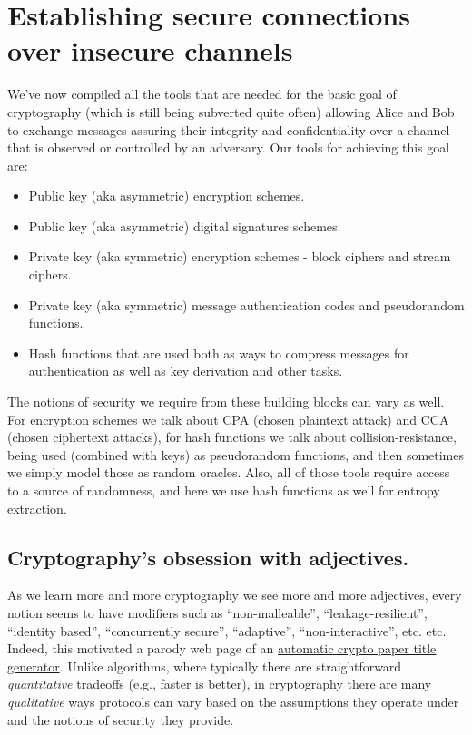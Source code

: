 \chapter{Establishing secure connections over insecure
channels}\label{12-Establishing-secure-co}

We've now compiled all the tools that are needed for the basic goal of
cryptography (which is still being subverted quite often) allowing Alice
and Bob to exchange messages assuring their integrity and
confidentiality over a channel that is observed or controlled by an
adversary. Our tools for achieving this goal are:

\begin{itemize}
\item
  Public key (aka asymmetric) encryption schemes.
\item
  Public key (aka asymmetric) digital signatures schemes.
\item
  Private key (aka symmetric) encryption schemes - block ciphers and
  stream ciphers.
\item
  Private key (aka symmetric) message authentication codes and
  pseudorandom functions.
\item
  Hash functions that are used both as ways to compress messages for
  authentication as well as key derivation and other tasks.
\end{itemize}

The notions of security we require from these building blocks can vary
as well. For encryption schemes we talk about CPA (chosen plaintext
attack) and CCA (chosen ciphertext attacks), for hash functions we talk
about collision-resistance, being used (combined with keys) as
pseudorandom functions, and then sometimes we simply model those as
random oracles. Also, all of those tools require access to a source of
randomness, and here we use hash functions as well for entropy
extraction.

\section{Cryptography's obsession with
adjectives.}\label{12-Cryptographys-obsessio}

As we learn more and more cryptography we see more and more adjectives,
every notion seems to have modifiers such as ``non-malleable'',
``leakage-resilient'', ``identity based'', ``concurrently secure'',
``adaptive'', ``non-interactive'', etc. etc. Indeed, this motivated a
parody web page of an
\href{https://cseweb.ucsd.edu/~mihir/crypto-topic-generator.html}{automatic
crypto paper title generator}. Unlike algorithms, where typically there
are straightforward \emph{quantitative} tradeoffs (e.g., faster is
better), in cryptography there are many \emph{qualitative} ways
protocols can vary based on the assumptions they operate under and the
notions of security they provide.

